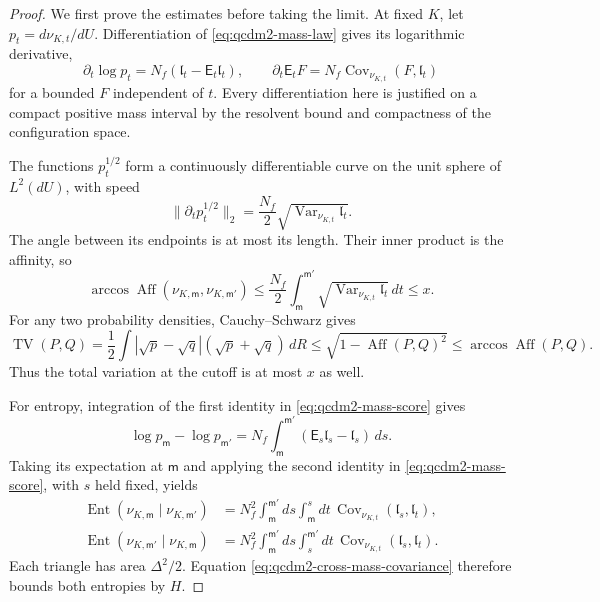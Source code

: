 \documentclass[11pt,letterpaper,reqno]{amsart}
\theoremstyle{definition}
\theoremstyle{remark}
\begin{document}
\begin{proof}
We first prove the estimates before taking the limit. At
fixed $K$, let $p_t=d\nu_{K,t}/dU$. Differentiation of
\eqref{eq:qcdm2-mass-law} gives its logarithmic derivative,
\begin{equation}\label{eq:qcdm2-mass-score}
 \partial_t\log p_t
    =N_f(\mathfrak l_t-\mathsf E_t\mathfrak l_t),
 \qquad
 \partial_t\mathsf E_tF
    =N_f\operatorname{Cov}_{\nu_{K,t}}(F,\mathfrak l_t)
\end{equation}
for a bounded $F$ independent of $t$. Every differentiation
here is justified on a compact positive mass interval by the
resolvent bound and compactness of the configuration space.

The functions $p_t^{1/2}$ form a continuously differentiable
curve on the unit sphere of $L^2(dU)$, with speed
\[
 \|\partial_t p_t^{1/2}\|_2
    =\frac{N_f}{2}
           \sqrt{\operatorname{Var}_{\nu_{K,t}}\mathfrak l_t}.
\]
The angle between its endpoints is at most its length.
Their inner product is the affinity, so
\begin{equation}\label{eq:qcdm2-cutoff-mass-angle}
 \arccos\operatorname{Aff}(\nu_{K,\mathsf m},\nu_{K,\mathsf m'})
 \le\frac{N_f}{2}\int_{\mathsf m}^{\mathsf m'}
        \sqrt{\operatorname{Var}_{\nu_{K,t}}\mathfrak l_t}\,dt
 \le x.
\end{equation}
For any two probability densities, Cauchy--Schwarz gives
\[
 \operatorname{TV}(P,Q)
 =\frac12\int|\sqrt p-\sqrt q|(\sqrt p+\sqrt q)\,dR
 \le\sqrt{1-\operatorname{Aff}(P,Q)^2}
 \le\arccos\operatorname{Aff}(P,Q).
\]
Thus the total variation at the cutoff is at most $x$ as well.

For entropy, integration of the first identity in
\eqref{eq:qcdm2-mass-score} gives
\[
 \log p_{\mathsf m}-\log p_{\mathsf m'}
 =N_f\int_{\mathsf m}^{\mathsf m'}
                (\mathsf E_s\mathfrak l_s-\mathfrak l_s)\,ds.
\]
Taking its expectation at $\mathsf m$ and applying the
second identity in \eqref{eq:qcdm2-mass-score}, with $s$
held fixed, yields
\begin{align}
 \operatorname{Ent}(\nu_{K,\mathsf m}\mid\nu_{K,\mathsf m'})
 &=N_f^2\int_{\mathsf m}^{\mathsf m'}\!ds
        \int_{\mathsf m}^{s}\!dt\,
           \operatorname{Cov}_{\nu_{K,t}}(\mathfrak l_s,\mathfrak l_t),
       \label{eq:qcdm2-mass-entropy-triangle}\\
 \operatorname{Ent}(\nu_{K,\mathsf m'}\mid\nu_{K,\mathsf m})
 &=N_f^2\int_{\mathsf m}^{\mathsf m'}\!ds
        \int_s^{\mathsf m'}\!dt\,
           \operatorname{Cov}_{\nu_{K,t}}(\mathfrak l_s,\mathfrak l_t).
       \label{eq:qcdm2-mass-reverse-entropy-triangle}
\end{align}
Each triangle has area $\Delta^2/2$.
Equation \eqref{eq:qcdm2-cross-mass-covariance} therefore
bounds both entropies by $H$.


\end{proof}
\end{document}
